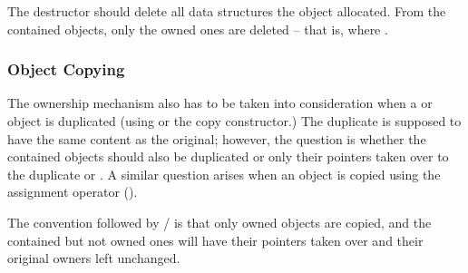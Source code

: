 The destructor should delete all data structures the object allocated.
From the contained objects, only the owned ones are deleted -- that is,
where .


\subsubsection{Object Copying}

The ownership mechanism also has to be taken into consideration
when a  or  object is duplicated
(using  or the copy constructor.)
The duplicate is supposed to have the same content as the
original; however, the question is whether the contained objects
should also be duplicated or only their pointers taken over
to the duplicate  or . A similar
question arises when an object is copied using the assignment operator
().

The convention followed by / is that
only owned objects are copied, and the contained but not owned ones
will have their pointers taken over and their original owners
left unchanged.


%
%
%
%
%
%
%


